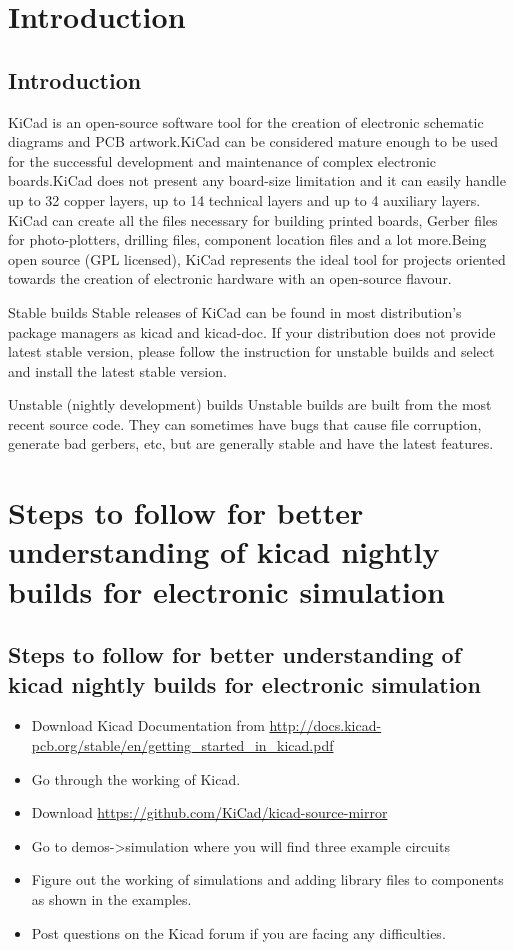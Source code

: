 \documentclass[12pt,a4paper]{  report}
\begin{document}
\tableofcontents

\chapter{\textbf{Introduction}}
\section{Introduction}
KiCad is an open-source software tool for the creation of electronic schematic diagrams and PCB artwork.KiCad can be considered mature enough to be used for the successful development and maintenance of complex electronic boards.KiCad does not present any board-size limitation and it can easily handle up to 32 copper layers, up to 14 technical layers and up to 4 auxiliary layers. KiCad can create all the files necessary for building printed boards, Gerber files for photo-plotters, drilling files, component location files and a lot more.Being open source (GPL licensed), KiCad represents the ideal tool for projects oriented towards the creation of electronic hardware with an open-source flavour.

Stable builds
Stable releases of KiCad can be found in most distribution’s package managers as kicad and kicad-doc. If your distribution does not provide latest stable version, please follow the instruction for unstable builds and select and install the latest stable version.

Unstable (nightly development) builds
Unstable builds are built from the most recent source code. They can
sometimes have bugs that cause file corruption, generate bad gerbers, etc, but are generally stable and have the latest  features.

\chapter{\textbf{Steps to follow for better understanding of kicad nightly builds for electronic simulation}}
\section{Steps to follow for better understanding of kicad nightly builds for electronic simulation}
\begin{itemize}
\item Download Kicad Documentation from \url{http://docs.kicad-pcb.org/stable/en/getting_started_in_kicad.pdf}
\item Go through the working of Kicad.
\item Download \url{https://github.com/KiCad/kicad-source-mirror}
\item Go to demos->simulation where you will find three example circuits
\item Figure out the working of simulations and adding library files to components as shown in the examples.
\item  Post questions on the Kicad forum if you are facing any difficulties.
\end{itemize}
\end{document}

